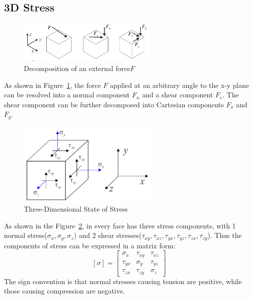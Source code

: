 \documentclass[en,hazy,cyan,8pt,normal]{elegantnote}
\begin{document}
  \subsection{3D Stress}
    \begin{figure}[H]
      \centering
      \includegraphics[width=0.6\textwidth]{image/002.png}
      \caption{Decomposition of an external force$F$}
      \label{fig:002}
    \end{figure}
    As shown in Figure~\ref{fig:002}, the force $F$ applied at an arbitrary angle to the x-y plane can be resolved into a normal component $F_n$ and a shear component $F_s$. The shear component can be further decomposed into Cartesian components $F_x$ and $F_y$.
    \begin{figure}[H]
      \centering
      \includegraphics[width=0.6\textwidth]{image/003.png}
      \caption{Three-Dimensional State of Stress}
      \label{fig:003}
    \end{figure}
    As shown in the Figure~\ref{fig:003}, in every face has three stress components, with 1 normal stress($\sigma_x, \sigma_y, \sigma_z$) and 2 shear stresses($\tau_{xy}, \tau_{xz}, \tau_{yx}, \tau_{yz}, \tau_{zx}, \tau_{zy}$). Thus the components of stress can be expressed in a matrix form:
    \begin{equation}\label{eq:003}
      [\sigma]=
      \begin{bmatrix}
        \sigma_x & \tau_{xy} & \tau_{xz}\\
        \tau_{yx} & \sigma_y & \tau_{yz}\\
        \tau_{zx} & \tau_{zy} & \sigma_z
      \end{bmatrix}
    \end{equation}
    The sign convention is that normal stresses causing tension are positive, while those causing compression are negative.
\end{document}
